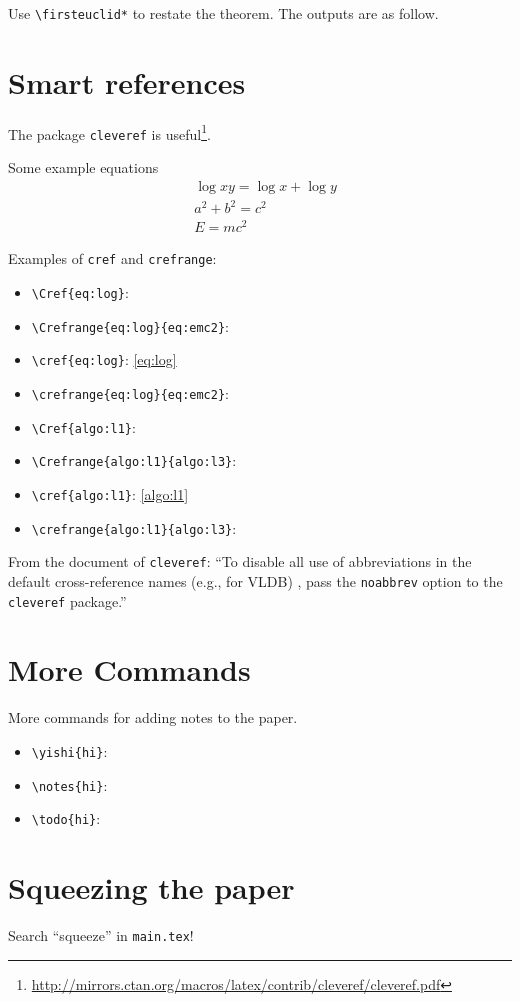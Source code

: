 Use \verb|\firsteuclid*| to restate the theorem. 
The outputs are as follow.

\firsteuclid*

\section{Smart references}

The package \texttt{cleveref} is
useful\footnote{\url{http://mirrors.ctan.org/macros/latex/contrib/cleveref/cleveref.pdf}}.

Some example equations
\begin{align}
  &\log xy = \log x + \log y \label{eq:log}\\
  &a^2 +b^2=c^2\label{eq:pyth} \\
  &E=mc^2 \label{eq:emc2}
\end{align}

Examples of \texttt{cref} and \texttt{crefrange}:
\begin{itemize}
\item \verb|\Cref{eq:log}|: 
\item \verb|\Crefrange{eq:log}{eq:emc2}|: 
\item \verb|\cref{eq:log}|: \cref{eq:log}
\item \verb|\crefrange{eq:log}{eq:emc2}|: 
\item \verb|\Cref{algo:l1}|: 
\item \verb|\Crefrange{algo:l1}{algo:l3}|: 
\item \verb|\cref{algo:l1}|: \cref{algo:l1}
\item \verb|\crefrange{algo:l1}{algo:l3}|: 
\end{itemize}

From the document of \texttt{cleveref}: ``To disable all use of abbreviations in
the default cross-reference names (e.g., for VLDB) , pass the \texttt{noabbrev}
option to the \texttt{cleveref} package.''

\section{More Commands}

More commands for adding notes to the paper.

\begin{itemize}
\item \verb|\yishi{hi}|: 
\item \verb|\notes{hi}|: 
\item \verb|\todo{hi}|: 
\end{itemize}

\section{Squeezing the paper}

Search ``squeeze'' in \texttt{main.tex}!